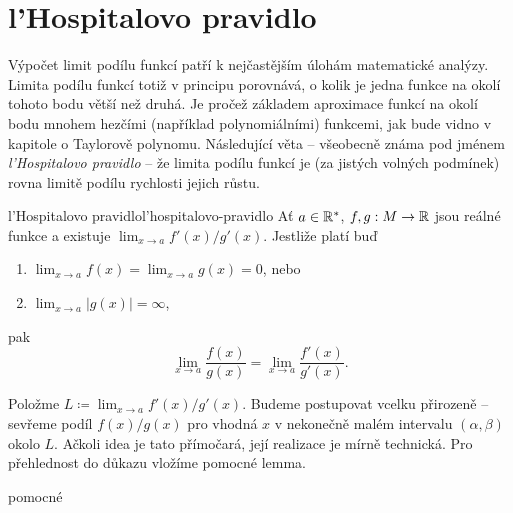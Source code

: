 \section{l'Hospitalovo pravidlo}
\label{sec:l'hospitalovo-pravidlo}

Výpočet limit podílu funkcí patří k nejčastějším úlohám matematické analýzy.
Limita podílu funkcí totiž v principu porovnává, o kolik je jedna funkce na
okolí tohoto bodu větší než druhá. Je pročež základem aproximace funkcí na okolí
bodu mnohem hezčími (například polynomiálními) funkcemi, jak bude vidno v
kapitole o Taylorově polynomu. Následující věta -- všeobecně známa pod jménem
\emph{l'Hospitalovo pravidlo} -- že limita podílu funkcí je (za jistých volných
podmínek) rovna limitě podílu rychlosti jejich růstu.

\begin{theorem}{l'Hospitalovo pravidlo}{l'hospitalovo-pravidlo}
 Ať $a \in \mathbb{R}^{*}$, $f,g:M \to \mathbb{R}$ jsou reálné funkce a existuje $\lim_{x \to a}
 f'(x) / g'(x)$. Jestliže platí buď
 \begin{enumerate}[label=(\alph*)]
  \item $\lim_{x \to a} f(x) = \lim_{x \to a} g(x) = 0$, nebo
  \item $\lim_{x \to a} |g(x)| = \infty$,
 \end{enumerate}
 pak
 \[
  \lim_{x \to a} \frac{f(x)}{g(x)} = \lim_{x \to a} \frac{f'(x)}{g'(x)}.
 \]
\end{theorem}
\begin{thmproof}
 Položme $L \coloneqq \lim_{x \to a} f'(x) / g'(x)$. Budeme postupovat vcelku
 přirozeně -- sevřeme podíl $f(x) / g(x)$ pro vhodná $x$ v nekonečně malém
 intervalu $(\alpha,\beta)$ okolo $L$. Ačkoli idea je tato přímočará, její
 realizace je mírně technická. Pro přehlednost do důkazu vložíme pomocné lemma.

 \begin{lemma*}{pomocné}
  
 \end{lemma*}
\end{thmproof}
